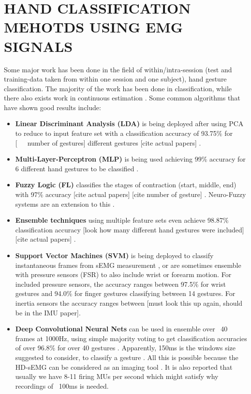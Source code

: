 \documentclass{article}
\begin{document}
\section{HAND CLASSIFICATION MEHOTDS USING EMG SIGNALS}
Some major work has been done in the field of within/intra-session (test and training-data taken from within one session and one subject), hand gesture classification. The majority of the work has been done in classification, while there also exists work in continuous estimation \cite{El-Khoury2015}. Some common algorithms that have shown good results include:

\begin{itemize}
\item \textbf{Linear Discriminant Analysis (LDA)} is being deployed after using PCA to reduce to input feature set with a classification accuracy of 93.75\% for [~~~number of gestures] different gestures [cite actual papers] \cite{Nazmi2016}.
\item \textbf{Multi-Layer-Perceptron (MLP)} is being used achieving 99\% accuracy for 6 different hand gestures to be classified \cite{Khushaba2007} \cite{Nazmi2016}.
\item\textbf{Fuzzy Logic (FL)} classifies the stages of contraction (start, middle, end) with 97\% accuracy [cite actual papers] [cite number of gesture] \cite{Nazmi2016}. Neuro-Fuzzy systems are an extension to this \cite{Khezri2011}.
\item\textbf{Ensemble techniques} using multiple feature sets even achieve 98.87\% classification accuracy [look how many different hand gestures were included] [cite actual papers] \cite{Nazmi2016}.
\item\textbf{Support Vector Machines (SVM)} is being deployed to classify instantaneous frames from sEMG measurement \cite{Saponas2010}, or are sometimes ensemble with pressure sensors (FSR) to also include wrist \cite{McIntosh2016} or forearm \cite{} motion. For included pressure sensors, the accuracy ranges between 97.5\% for wrist gestures and 94.0\% for finger gestures classifying between 14 gestures. For inertia sensors the accuracy ranges between [must look this up again, should be in the IMU paper].
\item\textbf{Deep Convolutional Neural Nets} can be used in ensemble over ~40 frames at 1000Hz, using simple majority voting to get classification accuracies of over 96.8\% for over 40 gestures \cite{Geng2016}. Apparently, 150ms is the windows size suggested to consider, to classify a gesture \cite{Geng2016}. All this is possible because the HD-sEMG can be considered as an imaging tool \cite{Merletti2008}. It is also reported that usually we have 8-11 firing MUs per second \cite{Martinez-Valdes2016} which might satisfy why recordings of ~100ms is needed.
\end{itemize}
\end{document}
